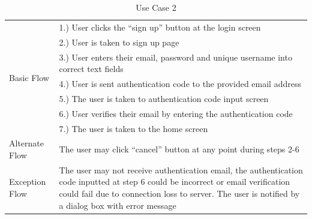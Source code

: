 \documentclass{article}
\begin{document}
\begin{appendicies}
\begin{table}[!htbp]
\begin{tabular}{||m{6cm}|m{6cm}||}
    \hline
    \multirow{7}{\hsize}{Basic Flow} 
                                    & 1.) User clicks the “sign up” button at the login screen\\
                                    & 2.) User is taken to sign up page\\ 
                                    & 3.) User enters their email, password and unique username into correct text fields\\
                                    & 4.) User is sent authentication code to the provided email address\\
                                    & 5.) The user is taken to authentication code input screen\\
                                    & 6.) User verifies their email by entering the authentication code\\
                                    & 7.) The user is taken to the home screen\\
    \hline
    Alternate Flow & The user may click “cancel” button at any point during steps 2-6\\
    \hline 
    Exception Flow & The user may not receive authentication email, the authentication code inputted at step 6 could be incorrect or email verification could fail due to connection loss to server. The  user is notified by a dialog box with error message\\
\hline
\end{tabular}
\caption{Use Case 2}
\label{table:UC2}
\end{table}


\end{appendicies}
\end{document}
